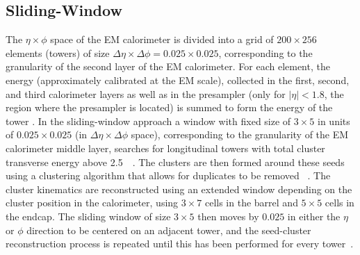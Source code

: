 \subsection{Sliding-Window}
The $\eta\times\phi$ space of the EM calorimeter is divided into a grid of $200 \times 256$ elements (towers) of size $\Delta\eta\times\Delta\phi=0.025\times0.025$, corresponding to the granularity of the second layer of the EM calorimeter.
For each element, the energy (approximately calibrated at the EM scale), collected in the first, second, and third calorimeter layers as well as in the presampler (only for $|\eta|<1.8$, the region where the presampler is located) is summed to form the energy of the tower \cite{EGAM-2018-01}.
In the sliding-window approach a window with fixed size of $3\times5$ in units of $0.025 \times 0.025$ (in $\Delta\eta \times \Delta\phi$ space), corresponding to the granularity of the EM calorimeter middle layer, searches for longitudinal towers with total cluster transverse energy above 2.5~\GeV~\cite{EGAM-2018-01}.  
The clusters are then formed around these seeds using a clustering algorithm that allows for duplicates to be removed~\cite{TopoNote} .
The cluster kinematics are reconstructed using an extended window depending on the cluster position in the calorimeter, using $3\times7$ cells in the barrel and $5\times5$ cells in the endcap. 
The sliding window of size $3\times5$ then moves by $0.025$ in either the $\eta$ or $\phi$ direction to be centered on an adjacent tower, and the seed-cluster reconstruction process is repeated until this has been performed for every tower~\cite{EGAM-2018-01}.


